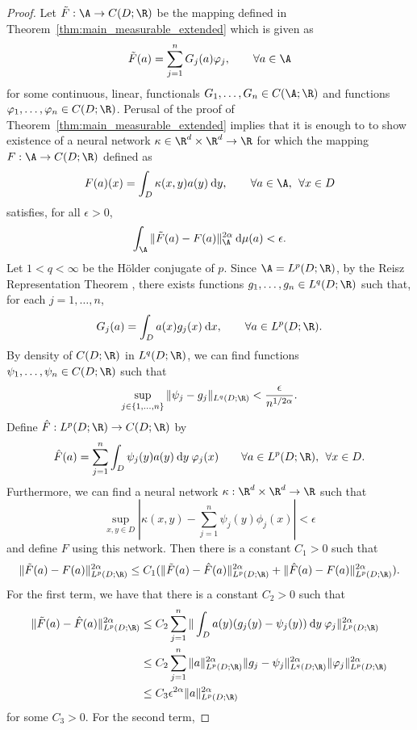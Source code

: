 \begin{proof}
Let \(\tilde{F}: \A \to C(D;\R)\) be the mapping defined in Theorem~\ref{thm:main_measurable_extended} which is given as
\[\tilde{F}(a) = \sum_{j=1}^n G_j(a) \varphi_j, \qquad \forall a \in \A\]
for some continuous, linear, functionals \(G_1,\dots,G_n \in C(\A;\R)\)
and functions \(\varphi_1,\dots,\varphi_n \in C(D;\R)\). Perusal of the proof of Theorem~\ref{thm:main_measurable_extended} implies that it is enough to to show existence of a neural network \(\kappa \in \R^d \times \R^d \to \R\) for which the mapping \(F: \A \to C(D;\R)\) defined as
\[F(a)(x) = \int_D \kappa(x,y) a(y) \: \text{d}y, \qquad \forall a \in \A, \:\: \forall x \in D\]
satisfies, for all \(\epsilon > 0\),
\[\int_{\A} \|\tilde{F}(a) - F(a)\|_{\A}^{2\alpha} \: \text{d} \mu(a) < \epsilon.\]
Let \(1 < q < \infty\) be the H{\"o}lder conjugate of \(p\). Since \(\A = L^p(D;\R)\), by the Reisz Representation Theorem \citep[Appendix B]{conway85acourse}, there exists functions \(g_1,\dots,g_n \in L^q(D;\R)\) such that, for each \(j=1,\dots,n\),
\[G_j(a) = \int_D a(x) g_j(x) \: \text{d}x, \qquad \forall a \in L^p(D;\R).\]
By density of \(C(D;\R)\) in \(L^q(D;\R)\), we can find functions \(\psi_1,\dots,\psi_n \in C(D;\R)\) such that
\[\sup_{j \in \{1,\dots,n\}}  \|\psi_j - g_j\|_{L^q(D;\R)} < \frac{\epsilon}{n^{1/2\alpha}}.\]
Define \(\hat{F} : L^p(D;\R) \to C(D;\R)\) by
\[\hat{F}(a) = \sum_{j=1}^n \int_D \psi_j(y) a(y) \: \text{d}y \: \varphi_j(x) \qquad \forall a \in L^p(D;\R), \:\: \forall x \in D.\]
Furthermore, we can find a neural network \(\kappa : \R^d \times \R^d \to \R\) such that 
\[\sup_{x,y \in D} |\kappa(x,y) - \sum_{j=1}^n \psi_j(y) \phi_j(x) | < \epsilon\]
and define \(F\) using this network. Then there is a constant \(C_1 > 0\) such that 
\[\|\tilde{F}(a) - F(a)\|_{L^p(D;\R)}^{2\alpha}  \leq C_1 ( \|\tilde{F}(a) - \hat{F}(a)\|_{L^p(D;\R)}^{2\alpha} + \|\hat{F}(a) - F(a)\|_{L^p(D;\R)}^{2\alpha}).\]
For the first term, we have that there is a constant \(C_2 > 0\) such that
\begin{align*}
    \|\tilde{F}(a) - \hat{F}(a)\|_{L^p(D;\R)}^{2\alpha} &\leq C_2 \sum_{j=1}^n \| \int_D a(y) (g_j(y) - \psi_j(y)) \: \text{d}y \: \varphi_j \|_{L^p(D;\R)}^{2\alpha} \\
    &\leq C_2 \sum_{j=1}^n \|a\|_{L^p(D;\R)}^{2\alpha} \|g_j - \psi_j\|_{L^q(D;\R)}^{2\alpha } \|\varphi_j\|_{L^p(D;\R)}^{2\alpha} \\
    &\leq C_3 \epsilon^{2\alpha} \|a\|^{2\alpha}_{L^p(D;\R)}
\end{align*}
for some \(C_3 > 0\). For the second term,

\end{proof}
